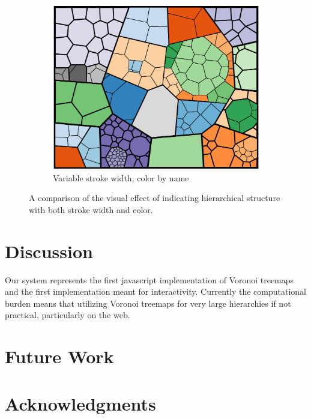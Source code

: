 \documentclass{acm_proc_article-sp} \usepackage{cite}
\begin{document}
\begin{figure}
        \begin{subfigure}[b]{\comparelength}
                \includegraphics[width=\textwidth]{source-images/compare-stroke-name-cropped.PNG}
                \caption{Variable stroke width, color by name}
        \end{subfigure}
\caption{A comparison of the visual effect of indicating hierarchical structure with both stroke width and color.}
\label{fig:comparestrokecolor}
\end{figure}



\section{Discussion}
\label{sec:discussion}
Our system represents the first javascript implementation of Voronoi
treemaps and the first implementation meant for
interactivity. Currently the computational burden means that utilizing
Voronoi treemaps for very large hierarchies if not practical,
particularly on the web.

\section{Future Work}
\label{sec:future}


\section{Acknowledgments}
\label{sec:acknowledgements}




{} 
\end{document}
